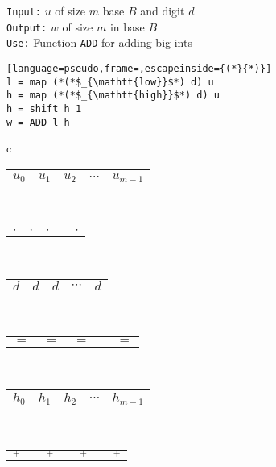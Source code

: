 \begin{figure}
  \centering
  \begin{minipage}{0.45\textwidth}
    \small
    \texttt{Input:} $u$ of size $m$ base $B$ and digit $d$\\
    \texttt{Output:} $w$ of size $m$ in base $B$\\
    \texttt{Use:} Function \texttt{ADD} for adding big ints
\begin{lstlisting}[language=pseudo,frame=,escapeinside={(*}{*)}]
l = map (*(*$_{\mathtt{low}}$*) d) u
h = map (*(*$_{\mathtt{high}}$*) d) u
h = shift h 1
w = ADD l h
\end{lstlisting}
  \end{minipage}
  \begin{minipage}{0.45\textwidth}
    \centering
    \footnotesize
    \begin{tabular}{c}
      \begin{tabular}{|C{0.7cm}|C{0.7cm}|C{0.7cm}|C{0.7cm}|C{0.7cm}|}
        \hline
        $u_0$ & $u_1$ & $u_2$ & $\cdots$ & $u_{m-1}$\\ 
        \hline
      \end{tabular}\\[-0.3ex]
      \begin{tabular}{C{0.7cm}C{0.7cm}C{0.7cm}C{0.7cm}C{0.7cm}}
        $\cdot$ & $\cdot$ & $\cdot$ & & $\cdot$\\ 
      \end{tabular}\\[-0.7ex]
      \begin{tabular}{C{0.7cm}C{0.7cm}C{0.7cm}C{0.7cm}C{0.7cm}}
        $d$ & $d$ &  $d$ & $\cdots$ &$d$ \\
      \end{tabular}\\[-0.5ex]
      \begin{tabular}{C{0.7cm}C{0.7cm}C{0.8cm}C{0.7cm}C{0.7cm}}
        $=$ & $=$ & $=$ &  & $=$  
      \end{tabular}\\
      \begin{tabular}{|C{0.7cm}|C{0.7cm}|C{0.7cm}|C{0.7cm}|C{0.7cm}|}
        \hline
        $h_{0}$ & $h_1$ & $h_2$ & $\cdots$ & $h_{m-1}$\\
        \hline
      \end{tabular}\\
      \begin{tabular}{C{0.15cm}C{0.15cm}C{0.15cm}C{0.15cm}C{0.15cm}C{0.15cm}C{0.15cm}}
        \diagonalarrowdown{}$_+$ & & \diagonalarrowdown{}$_+$ &  & \diagonalarrowdown{}$_+$  &  & \diagonalarrowdown{}$_+$ \\

\end{tabular}
\end{tabular}
\end{minipage}
\end{figure}

